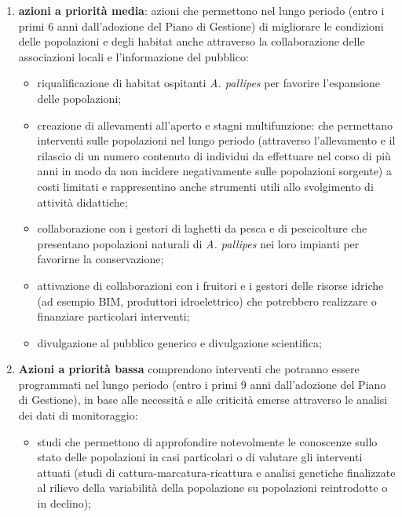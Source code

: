 \documentclass[11pt,a4paper,italian,twoside,openany]{memoir}
\begin{document}
\begin{enumerate}[label={\arabic*)}]
\begin{itemize}
  \end{itemize}
  \item \textbf{azioni a priorità media}: azioni che permettono nel lungo periodo (entro i primi 6 anni dall'adozione del Piano di Gestione) di migliorare le condizioni delle popolazioni e degli habitat anche attraverso la collaborazione delle associazioni locali e l'informazione del pubblico:
  \begin{itemize}
    \item riqualificazione di habitat ospitanti \emph{A. pallipes} per favorire l'espansione delle popolazioni;
    \item creazione di allevamenti all'aperto e stagni multifunzione: che permettano interventi sulle popolazioni nel lungo periodo (attraverso l'allevamento e il rilascio di un numero contenuto di individui da effettuare nel corso di più anni in modo da non incidere negativamente sulle popolazioni sorgente) a costi limitati e rappresentino anche strumenti utili allo svolgimento di attività didattiche; 
    \item collaborazione con i gestori di laghetti da pesca e di pescicolture che presentano popolazioni naturali di \emph{A. pallipes} nei loro impianti per favorirne la conservazione;
    \item attivazione di collaborazioni con i fruitori e i gestori delle risorse idriche (ad esempio BIM, produttori idroelettrico) che potrebbero realizzare o finanziare particolari interventi;
    \item divulgazione al pubblico generico e divulgazione scientifica;
  \end{itemize}
  \item \textbf{Azioni a priorità bassa} comprendono interventi che potranno essere programmati nel lungo periodo (entro i primi 9 anni dall'adozione del Piano di Gestione), in base alle necessità e alle criticità emerse attraverso le analisi dei dati di monitoraggio:
  \begin{itemize}
    \item studi che permettono di approfondire notevolmente le conoscenze sullo stato delle popolazioni in casi particolari o di valutare gli interventi attuati (studi di cattura-marcatura-ricattura e analisi genetiche finalizzate al rilievo della variabilità della popolazione su popolazioni reintrodotte o in declino);
  \end{itemize}
\end{enumerate}
\end{document}
